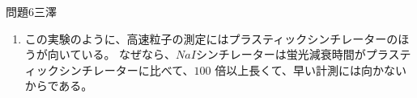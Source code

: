 \documentclass[fleqn]{jbook}
\begin{document}
\begin{answer}{問題6}{三澤}
\begin{enumerate}
これから、
\begin{equation}
\triangle E=\frac{1}{2}m\times (v_0^2-v_1^2) 
\end{equation}
である。
また、
\begin{equation}
\frac{L}{v_1}-\frac{L}{v_0}=t \Leftrightarrow  v_1=\frac{v_0L}{v_0\triangle t+L} 
\end{equation}
である。

(25),(26)から
\begin{equation}
\triangle E = \frac{1}{2}mv_0^2\times (1-\frac{L^2}{(v_0\triangle t+L)^2})
\end{equation}

値を代入して、

\begin{equation*}
 \begin{split}
 \triangle E &= 350\times ( 1-\frac{16}{ ( 4+8.2\times 5 \times 10^{-3})^{2}})\\
             &= 350\times ( 1-(1+10.25\times 10^{-3})^{-2} ) \\
             &= 350\times ( 1-(1-2\times 10.25\times 10^{-3}) )  \\
             &= 350\times 20.5\times 10^{-3} \\
             &= 7.175 
 \end{split}
\end{equation*}


よって、$\triangle E=7.2(keV)$である。 

\item
この実験のように、高速粒子の測定にはプラスティックシンチレーターのほうが向いている。
なぜなら、$NaI$シンチレーターは蛍光減衰時間がプラスティックシンチレーターに比べて、$100$
倍以上長くて、早い計測には向かないからである。
\end{enumerate}
\end{answer}
\end{document}
